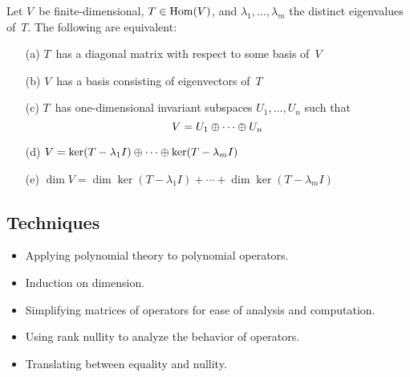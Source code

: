 \begin{thm}[Diagonalization]
Let \(V\)~be finite-dimensional, \(T\in\operatorname{Hom}(V)\), and \(\lambda_1,\ldots,\lambda_m\) the distinct eigenvalues of~\(T\). The following are equivalent:
\begin{enumerate}[itemsep=0pt]
\item[(a)] \(T\)~has a diagonal matrix with respect to some basis of~\(V\)
\item[(b)] \(V\)~has a basis consisting of eigenvectors of~\(T\)
\item[(c)] \(T\)~has one-dimensional invariant subspaces \(U_1,\ldots,U_n\) such that
\[V=U_1\oplus\cdots\oplus U_n\]
\item[(d)] \(V=\ker(T-\lambda_1I)\oplus\cdots\oplus\ker(T-\lambda_m I)\)
\item[(e)] \(\dim V=\dim\ker(T-\lambda_1I)+\cdots+\dim\ker(T-\lambda_m I)\)
\end{enumerate}
\end{thm}

\subsection*{Techniques}
\begin{itemize}[itemsep=0pt]
\item Applying polynomial theory to polynomial operators.
\item Induction on dimension.
\item Simplifying matrices of operators for ease of analysis and computation.
\item Using rank nullity to analyze the behavior of operators.
\item Translating between equality and nullity.
\end{itemize}
